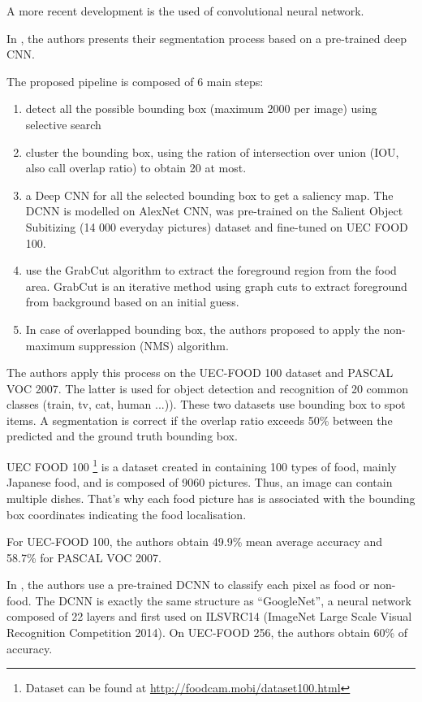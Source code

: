 
A more recent development is the used of convolutional neural network.

In \cite{Shimoda2015}, the authors presents their segmentation process based on a pre-trained deep CNN.

The proposed pipeline is composed of 6 main steps:
\begin{enumerate}
    \item detect all the possible bounding box (maximum 2000 per image) using selective search
    \item cluster the bounding box, using the ration of intersection over union (IOU, also call overlap ratio) to obtain 20 at most.
    \item a Deep CNN for all the selected bounding box to get a saliency map. The DCNN is modelled on AlexNet CNN, was pre-trained on the Salient Object Subitizing (14 000 everyday pictures) dataset and fine-tuned on UEC FOOD 100.
    \item use the GrabCut algorithm to extract the foreground region from the food area. GrabCut is an iterative method using graph cuts to extract foreground from background based on an initial guess.
    \item In case of overlapped bounding box, the authors proposed to apply the non-maximum suppression (NMS) algorithm.
\end{enumerate}

The authors apply this process on the UEC-FOOD 100 dataset and PASCAL VOC 2007. The latter is used for object detection and recognition of 20 common classes (train, tv, cat, human ...)). These two datasets use bounding box to spot items. A segmentation is correct if the overlap ratio exceeds 50\% between the predicted and the ground truth bounding box.

UEC FOOD 100 \footnote{Dataset can be found at \url{http://foodcam.mobi/dataset100.html}} is a dataset created in \cite{Matsuda2012a} containing 100 types of food, mainly Japanese food, and is composed of 9060 pictures. Thus, an image can contain multiple dishes. That's why each food picture has is associated with the bounding box coordinates indicating the food localisation.

For UEC-FOOD 100, the authors obtain 49.9\% mean average accuracy and 58.7\% for PASCAL VOC 2007.

In \cite{Bolanos2016}, the authors use a pre-trained DCNN to classify each pixel as food or non-food. The DCNN is exactly the same structure as \enquote{GoogleNet}, a neural network composed of 22 layers and first used on ILSVRC14 (ImageNet Large Scale Visual Recognition Competition 2014). On UEC-FOOD 256, the authors obtain 60\% of accuracy.

